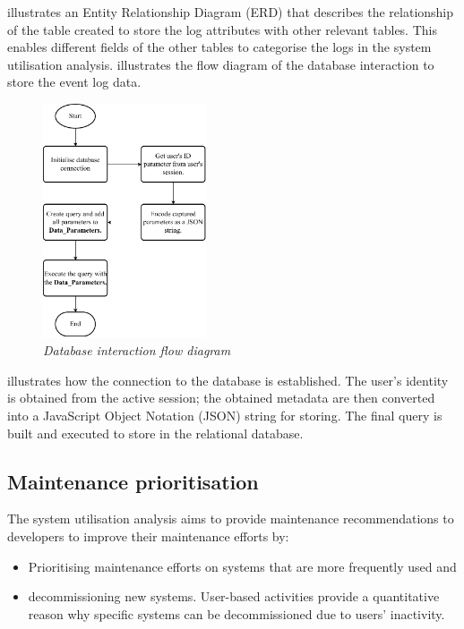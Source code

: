  illustrates an Entity Relationship Diagram (ERD) that describes the relationship of the table created to store the log attributes with other relevant tables. This enables different fields of the other tables to categorise the logs in the system utilisation analysis.  illustrates the flow diagram of the database interaction to store the event log data.

\begin{figure}[!htb]
	\centering
	\includegraphics[width=0.43\textwidth]{img/Chapter2/sql_interaction/sql_interaction.pdf}
	\caption[Database interaction flow diagram]
	{\textit{Database interaction flow diagram}}\label{fig:ch2_database}
\end{figure}

 illustrates how the connection to the database is established. The user's identity is obtained from the active session; the obtained metadata are then converted into a JavaScript Object Notation (JSON) string for storing. The final query is built and executed to store in the relational database.

\subsection{Maintenance prioritisation}
The system utilisation analysis aims to provide maintenance recommendations to developers to improve their maintenance efforts by:

\begin{itemize}
	\item Prioritising maintenance efforts on systems that are more frequently used and
	\item decommissioning new systems. User-based activities provide a quantitative reason why specific systems can be decommissioned due to users' inactivity.
\end{itemize}

